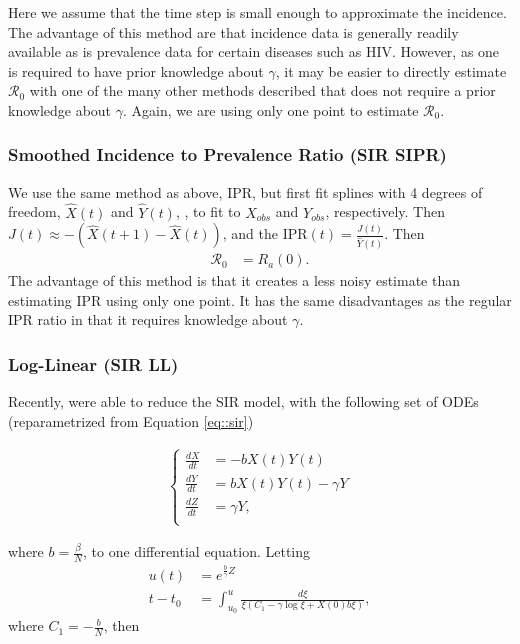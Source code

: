 \documentclass[12pt]{article}
\newcommand{\rr}{\ensuremath{\mathcal{R}_0}}
\begin{document}
Here we assume that the time step is small enough to approximate the incidence.  The advantage of this method are that incidence data is generally readily available as is prevalence data for certain diseases such as HIV.  However, as one is required to have prior knowledge about $\gamma$, it may be easier to directly estimate $\rr$ with one of the many other methods described that does not require a prior knowledge about $\gamma$.  Again, we are using only one point to estimate $\rr$.

\subsubsection{Smoothed Incidence to Prevalence Ratio (SIR SIPR)}
We use the same method as above, IPR, but first fit splines with 4 degrees of freedom, $\hat{X}(t)$ and $\hat{Y}(t)$, , to fit to $X_{obs}$ and $Y_{obs}$, respectively.  Then  $J(t) \approx -(\hat{X}(t+1) - \hat{X}(t))$, and the IPR$(t) = \frac{J(t)}{\hat{Y}(t)}$.  Then
\begin{align*}
\rr &= R_a(0).  
\end{align*}
The advantage of this method is that it creates a less noisy estimate than estimating IPR using only one point.  It has the same disadvantages as the regular IPR ratio in that it requires knowledge about $\gamma$.

\subsubsection{Log-Linear (SIR LL)}
Recently, \cite{harko2014exact} were able to reduce the SIR model, with the following set of ODEs (reparametrized from Equation \eqref{eq::sir})

\begin{align*}
  \left \{ \begin{array}{ll}
             \frac{dX}{dt} &= - b X(t) Y(t) \\
             \frac{dY}{dt} &=  b X(t) Y(t) - \gamma Y\\
             \frac{dZ}{dt} &= \gamma Y,\\
           \end{array}
  \right .
\end{align*}

where $b = \frac{\beta}{N}$, to one differential equation.  Letting
\begin{align*}
  u(t) &= e^{\frac{b}{\gamma}Z} \\
  t - t_0 &= \int_{u_0}^u \frac{d \xi}{\xi (C_1 - \gamma \log \xi + X(0) b \xi)},
\end{align*}
where $C_1 = -\frac{b}{N}$, then
\end{document}
